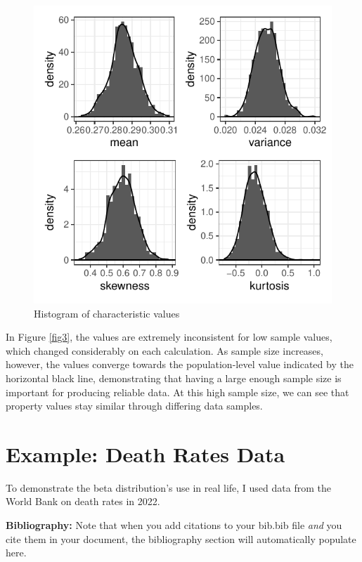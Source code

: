 \documentclass{article}\usepackage[]{graphicx}\usepackage[]{xcolor}
\begin{document}
\begin{multicols}{2}
\begin{figure}[H]
 \begin{center}
 \includegraphics[scale=0.7]{sampling_distrib.pdf}
 \caption{Histogram of characteristic values}
 \label{fig4}
 \end{center}
 \end{figure}

In Figure \ref{fig3}, the values are extremely inconsistent for low sample values, which changed considerably on each calculation. As sample size increases, however, the values converge towards the population-level value indicated by the horizontal black line, demonstrating that having a large enough sample size is important for producing reliable data. At this high sample size, we can see that property values stay similar through differing data samples.




\section{Example: Death Rates Data}
To demonstrate the beta distribution's use in real life, I used data from the World Bank on death rates in 2022. 

\vspace{2em}

\noindent\textbf{Bibliography:} Note that when you add citations to your bib.bib file \emph{and}
you cite them in your document, the bibliography section will automatically populate here.

\begin{tiny}

\end{tiny}
\end{multicols}
\end{document}
